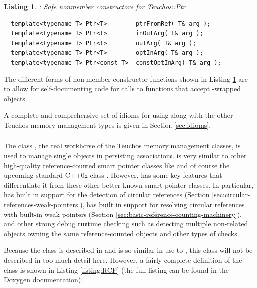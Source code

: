 \documentclass[pdf,ps2pdf,11pt]{SANDreport}
\newtheorem{listing}{Listing}
\begin{document}
\begin{listing}: Safe nonmember constructors for Teuchos::Ptr\\
\label{listing:ptr-from-ref-nonmember-constructors}
{\small\begin{verbatim}
  template<typename T> Ptr<T>        ptrFromRef( T& arg );
  template<typename T> Ptr<T>        inOutArg( T& arg );
  template<typename T> Ptr<T>        outArg( T& arg );
  template<typename T> Ptr<T>        optInArg( T& arg );
  template<typename T> Ptr<const T>  constOptInArg( T& arg );
\end{verbatim}}
\end{listing}

The different forms of non-member constructor functions shown in
Listing {}\ref{listing:ptr-from-ref-nonmember-constructors} are to
allow for self-documenting code for calls to functions that accept
{}-wrapped objects.

A complete and comprehensive set of idioms for using {}
along with the other Teuchos memory management types is given in
Section {}\ref{sec:idioms}.


%
{}\subsubsection{}
%

The class {}, the real workhorse of the Teuchos memory
management classes, is used to manage single objects in persisting
associations.  {} is very similar to other high-quality
reference-counted smart pointer classes like
{} and of course the upcoming standard
C++0x class {}.  However, {} has
some key features that differentiate it from these other better known
smart pointer classes.  In particular, {} has built in
support for the detection of circular references (Section
{}\ref{sec:circular-references-weak-pointers}), has built in support
for resolving circular references with built-in weak pointers (Section
{}\ref{sec:basic-reference-counting-machinery}), and other strong
debug runtime checking such as detecting multiple non-related
{} objects owning the same reference-counted objects and
other types of checks.

Because the class {} is described in
{}\cite{RefCountPtrBeginnersGuide} and is so similar in use to
{}, this class will not be described in too
much detail here.  However, a fairly complete definition of the class
{} is shown in Listing {}\ref{listing:RCP} (the full
listing can be found in the Doxygen documentation).
\end{document}
